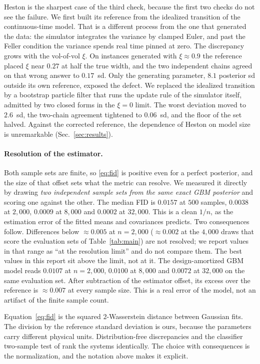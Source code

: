 \documentclass[10pt]{article}
\begin{document}
Heston is the sharpest case of the third check, because the first two checks do not see the failure.
We first built its reference from the idealized transition of the continuous-time model. That is a
different process from the one that generated the data: the simulator integrates the variance by
clamped Euler, and past the Feller condition the variance spends real time pinned at zero. The
discrepancy grows with the vol-of-vol $\xi$. On instances generated with $\xi \approx 0.9$ the
reference placed $\xi$ near $0.27$ at half the true width, and the two independent chains agreed on
that wrong answer to $0.17$~sd. Only the generating parameter, $8.1$ posterior sd outside its own
reference, exposed the defect. We replaced the idealized transition by a bootstrap particle filter
that runs the update rule of the simulator itself, admitted by two closed forms in the $\xi = 0$
limit. The worst deviation moved to $2.6$~sd, the two-chain agreement tightened to $0.06$~sd, and the
floor of the set halved. Against the corrected reference, the dependence of Heston on model size is
unremarkable (Sec.~\ref{sec:results}).

\paragraph{Resolution of the estimator.} Both sample sets are finite, so \eqref{eq:fid} is positive
even for a perfect posterior, and the size of that offset sets what the metric can resolve. We
measured it directly by drawing \emph{two independent sample sets from the same exact GBM posterior}
and scoring one against the other. The median FID is $0.0157$ at $500$ samples, $0.0038$ at
$2{,}000$, $0.0009$ at $8{,}000$ and $0.0002$ at $32{,}000$. This is a clean $1/n$, as the estimation
error of the fitted means and covariances predicts. Two consequences follow. Differences below
$\approx 0.005$ at $n = 2{,}000$ ($\approx 0.002$ at the $4{,}000$ draws that score the evaluation
sets of Table~\ref{tab:main}) are not resolved; we report values in that range as ``at the resolution
limit'' and do not compare them. The best values in this report sit above the limit, not at it. The
design-amortized GBM model reads $0.0107$ at $n = 2{,}000$, $0.0100$ at $8{,}000$ and $0.0072$ at
$32{,}000$ on the same evaluation set. After subtraction of the estimator offset, its excess over the
reference is $\approx 0.007$ at every sample size. This is a real error of the model, not an artifact
of the finite sample count.

Equation~\eqref{eq:fid} is the squared $2$-Wasserstein distance between Gaussian fits. The division
by the reference standard deviation is ours, because the parameters carry different physical units.
Distribution-free discrepancies and the classifier two-sample test of \citet{lueckmann2021} rank the
systems identically. The choice with consequences is the normalization, and the notation above makes
it explicit.
\end{document}
